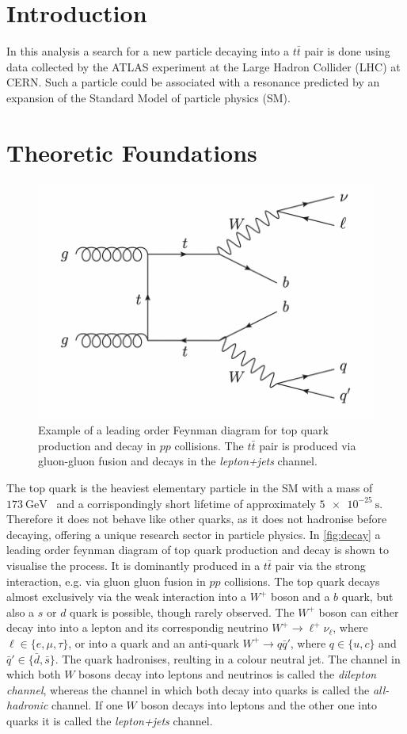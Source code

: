 \section{Introduction}
In this analysis a search for a new particle decaying into a $t\bar{t}$ pair is done using data collected by the ATLAS experiment at the Large Hadron Collider (LHC) at CERN. Such a particle could be associated with a resonance predicted by an expansion of the Standard Model of particle physics (SM).

\section{Theoretic Foundations}

\begin{figure}[tb]
  \centering
  \includegraphics[width=.8\textwidth]{graphics/top_decay.png}
  \caption{Example of a leading order Feynman diagram for top quark production and decay in $pp$ collisions. The $t\bar{t}$ pair is produced via gluon-gluon fusion and decays in the \textit{lepton+jets} channel.~\cite{anleitung}}
  \label{fig:decay}
\end{figure}

The top quark is the heaviest elementary particle in the SM with a mass of $\SI{173}{\giga\eV}$~\cite{pdg} and a corrispondingly short lifetime of approximately $\SI{5e-25}{\s}$. Therefore it does not behave like other quarks, as it does not hadronise before decaying, offering a unique research sector in particle physics.
In \autoref{fig:decay} a leading order feynman diagram of top quark production and decay is shown to visualise the process.
It is dominantly produced in a $t\bar{t}$ pair via the strong interaction, e.g. via gluon gluon fusion in $pp$ collisions. The top quark decays almost exclusively via the weak interaction into a $W^+$ boson and a $b$ quark, but also a $s$ or $d$ quark is possible, though rarely observed.
The $W^+$ boson can either decay into into a lepton and its correspondig neutrino $W^+ \to \ell^+ \nu_\ell$, where $\ell \in \{e, \mu, \tau\}$, or into a quark and an anti-quark $W^+ \to q\bar{q}\prime$, where $q \in \{u, c\}$ and $\bar{q}\prime \in \{\bar{d}, \bar{s}\}$.
The quark hadronises, reulting in a colour neutral jet. The channel in which both $W$ bosons decay into leptons and neutrinos is called the \textit{dilepton channel}, whereas the channel in which both decay into quarks is called the \textit{all-hadronic} channel. If one $W$ boson decays into leptons and the other one into quarks it is called the \textit{lepton+jets} channel.

